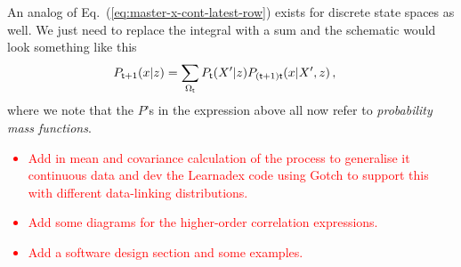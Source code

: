An analog of Eq.~(\ref{eq:master-x-cont-latest-row}) exists for discrete state spaces as well. We just need to replace the integral with a sum and the schematic would look something like this
\begin{align}
P_{{\sf t}+1}(x\vert z) &= \sum_{\Omega_{{\sf t}}} P_{{\sf t}}(X'\vert z) P_{({\sf t}+1){\sf t}}(x \vert X', z) \label{eq:master-x-disc} \,,
\end{align}
where we note that the $P$'s in the expression above all now refer to \emph{probability mass functions}.

\textcolor{red}{
\begin{itemize}
\item{Add in mean and covariance calculation of the process to generalise it continuous data and dev the Learnadex code using Gotch to support this with different data-linking distributions.}
\item{Add some diagrams for the higher-order correlation expressions.}
\item{Add a software design section and some examples.} 
\end{itemize}
}

    